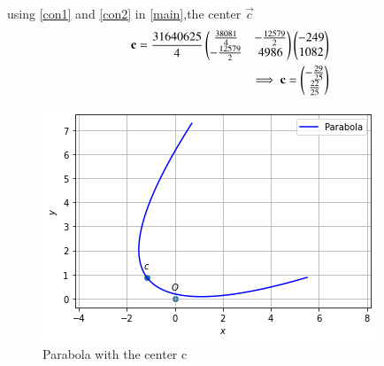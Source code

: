 \documentclass[journal,12pt,twocolumn]{IEEEtran}
\begin{document}
using \ref{con1} and \ref{con2} in \ref{main},the center $\vec{c}$
\begin{align}
    \mathbf{c}=\frac{31640625}{4}
    \begin{pmatrix}\frac{38081}{4}&- \frac{12579}{2} \\  -\frac{12579}{2} & 4986\end{pmatrix}\begin{pmatrix}-249 \\ 1082\end{pmatrix} \\
    \implies \mathbf{c}=\begin{pmatrix}-\frac{29}{25} \\ \frac{22}{25}\end{pmatrix} 
\end{align}

\renewcommand{\thefigure}{1}
\begin{figure}[!ht]
    \centering
    \includegraphics[width=\columnwidth]{parabola.png}
    \caption{Parabola with the center c}
    \label{Fig:1}
\end{figure}
\end{document}
